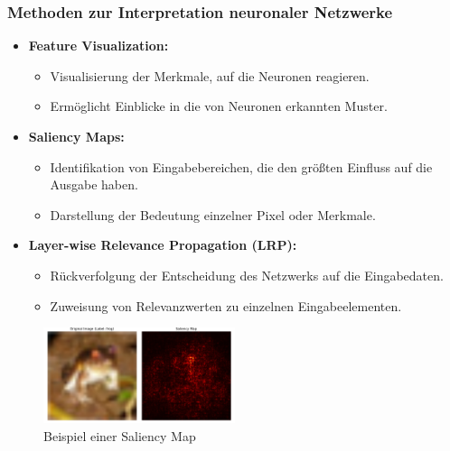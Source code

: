 \documentclass[aspectratio=1610, xcolor=dvipsnames, 9pt]{beamer}
\begin{document}
\begin{frame}
  \frametitle{Methoden zur Interpretation neuronaler Netzwerke}
  \begin{itemize}
      \item \textbf{Feature Visualization:}
      \begin{itemize}
          \item Visualisierung der Merkmale, auf die Neuronen reagieren.
          \item Ermöglicht Einblicke in die von Neuronen erkannten Muster.
      \end{itemize}
      \item \textbf{Saliency Maps:}
      \begin{itemize}
          \item Identifikation von Eingabebereichen, die den größten Einfluss auf die Ausgabe haben.
          \item Darstellung der Bedeutung einzelner Pixel oder Merkmale.
      \end{itemize}
      \item \textbf{Layer-wise Relevance Propagation (LRP):}
      \begin{itemize}
          \item Rückverfolgung der Entscheidung des Netzwerks auf die Eingabedaten.
          \item Zuweisung von Relevanzwerten zu einzelnen Eingabeelementen.
      \end{itemize}
  \end{itemize}
  \begin{figure}
      \centering
      \includegraphics[width=0.5\textwidth]{images/saliency_map.png}
      \caption{Beispiel einer Saliency Map}
  \end{figure}
\end{frame}
\end{document}
